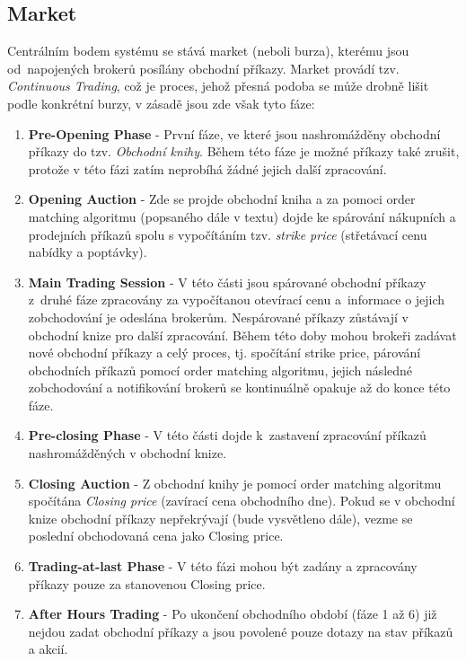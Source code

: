 \documentclass[thesis=M,czech]{FITthesis}[2012/06/26]
\begin{document}
\subsection{Market}
\label{fig:market_phases}

	Centrálním bodem systému se stává market (neboli burza), kterému jsou od~napojených brokerů posílány obchodní příkazy. Market provádí tzv. \textit{Continuous Trading}\cite{ContinuousTradingProcess}, což je proces, jehož přesná podoba se může drobně lišit podle konkrétní burzy, v zásadě jsou zde však tyto fáze:
	
\begin{enumerate}

  \item \textbf{Pre-Opening Phase} - První fáze, ve které jsou nashromážděny obchodní příkazy do tzv. \textit{Obchodní knihy}. Během této fáze je možné příkazy také zrušit, protože v této fázi zatím neprobíhá žádné jejich další zpracování.
  
  \item \textbf{Opening Auction} - Zde se projde obchodní kniha a za pomoci order matching algoritmu (popsaného dále v textu) dojde ke spárování nákupních a prodejních příkazů spolu s vypočítáním tzv. \textit{strike price} (střetávací cenu nabídky a poptávky).

  \item \textbf{Main Trading Session} - V této části jsou spárované obchodní příkazy z~druhé fáze zpracovány za vypočítanou otevírací cenu a~informace o jejich zobchodování je odeslána brokerům. Nespárované příkazy zůstávají v obchodní knize pro další zpracování. Během této doby mohou brokeři zadávat nové obchodní příkazy a celý proces, tj. spočítání strike price, párování obchodních příkazů pomocí order matching algoritmu, jejich následné zobchodování a notifikování brokerů se kontinuálně opakuje až do konce této fáze.
  
  \item \textbf{Pre-closing Phase} - V této části dojde k~zastavení zpracování příkazů nashromážděných v obchodní knize.
  
  \item \textbf{Closing Auction} - Z obchodní knihy je pomocí order matching algoritmu spočítána \textit{Closing price} (zavírací cena obchodního dne). Pokud se v obchodní knize obchodní příkazy nepřekrývají (bude vysvětleno dále), vezme se poslední obchodovaná cena jako Closing price.
  
  \item \textbf{Trading-at-last Phase} - V této fázi mohou být zadány a zpracovány příkazy pouze za stanovenou Closing price.
  
  \item \textbf{After Hours Trading} - Po ukončení obchodního období (fáze 1 až 6) již nejdou zadat obchodní příkazy a jsou povolené pouze dotazy na stav příkazů a akcií.

\end{enumerate}
\end{document}
